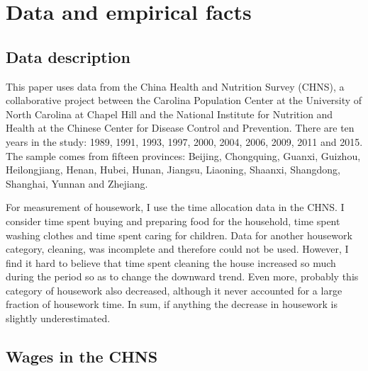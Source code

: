 \documentclass[12pt]{article}
\begin{document}

\clearpage
\appendix

%

\section{Data and empirical facts} \label{sec:dataappendix}

\subsection*{Data description}

This paper uses data from the China Health and Nutrition Survey (CHNS), a collaborative project between the Carolina Population Center at the University of North Carolina at Chapel Hill and the National Institute for Nutrition and Health at the Chinese Center for Disease Control and Prevention. There are ten years in the study: 1989, 1991, 1993, 1997, 2000, 2004, 2006, 2009, 2011 and 2015. The sample comes from fifteen provinces: Beijing, Chongquing, Guanxi, Guizhou, Heilongjiang, Henan, Hubei, Hunan, Jiangsu, Liaoning, Shaanxi, Shangdong, Shanghai, Yunnan and Zhejiang.   

For measurement of housework, I use the time allocation data in the CHNS. I consider time spent buying and preparing food for the household, time spent washing clothes and time spent caring for children. Data for another housework category, cleaning, was incomplete and therefore could not be used. However, I find it hard to believe that time spent cleaning the house increased so much during the period so as to change the downward trend. Even more, probably this category of housework also decreased, although it never accounted for a large fraction of housework time. In sum, if anything the decrease in housework is slightly underestimated. 

\subsection*{Wages in the CHNS}
\end{document}

